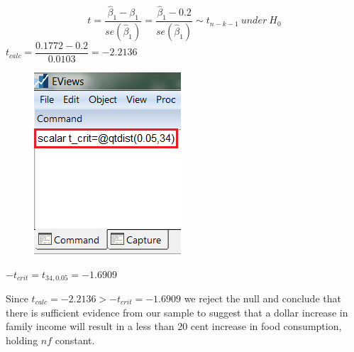 \documentclass[12pt]{report}
\begin{document}
$$t = \dfrac{\hat{\beta}_1 - \beta_1}{se(\hat{\beta}_1)} = \dfrac{\hat{\beta}_1 - 0.2}{se(\hat{\beta}_1)} \sim t_{n-k-1}\ under\ H_0$$
$t_{calc} = \dfrac{0.1772 - 0.2}{0.0103} = -2.2136$
\begin{figure}[H]
	\centering
	\includegraphics{tute10_5}
\end{figure}
\vspace{-\baselineskip}
$-t_{crit} = t_{34,0.05} = -1.6909$

\justify \noindent Since $t_{calc} = -2.2136 > -t_{crit} = -1.6909$ we reject the null and conclude that there is sufficient evidence from our sample to suggest that a dollar increase in family income will result in a less than 20 cent increase in food consumption, holding $nf$ constant.
\end{document}
